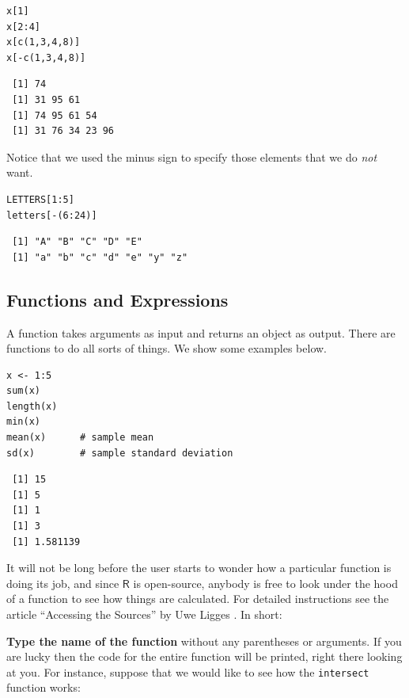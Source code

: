 \documentclass[captions=tableheading]{scrbook}
\begin{document}
\lstset{language=R}
\begin{lstlisting}
x[1]
x[2:4]
x[c(1,3,4,8)]
x[-c(1,3,4,8)]
\end{lstlisting}

\begin{verbatim}
 [1] 74
 [1] 31 95 61
 [1] 74 95 61 54
 [1] 31 76 34 23 96
\end{verbatim}

Notice that we used the minus sign to specify those elements that we do \emph{not} want. 


\lstset{language=R}
\begin{lstlisting}
LETTERS[1:5]
letters[-(6:24)]
\end{lstlisting}

\begin{verbatim}
 [1] "A" "B" "C" "D" "E"
 [1] "a" "b" "c" "d" "e" "y" "z"
\end{verbatim}
\subsection{Functions and Expressions}
\label{sec-2-3-4}
\label{sub-Functions-and-Expressions}


A function takes arguments as input and returns an object as output. There are functions to do all sorts of things. We show some examples below.


\lstset{language=R}
\begin{lstlisting}
x <- 1:5
sum(x)
length(x)
min(x)
mean(x)      # sample mean
sd(x)        # sample standard deviation
\end{lstlisting}

\begin{verbatim}
 [1] 15
 [1] 5
 [1] 1
 [1] 3
 [1] 1.581139
\end{verbatim}

It will not be long before the user starts to wonder how a particular function is doing its job, and since \(\mathsf{R}\) is open-source, anybody is free to look under the hood of a function to see how things are calculated. For detailed instructions see the article ``Accessing the Sources'' by Uwe Ligges \cite{Ligges2006}. In short:

\textbf{Type the name of the function} without any parentheses or arguments. If you are lucky then the code for the entire function will be printed, right there looking at you. For instance, suppose that we would like to see how the \texttt{intersect} function works:
\end{document}
